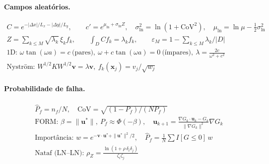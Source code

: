 \paragraph{Campos aleatórios.}
\begin{gather*}
  C = e^{-|\Delta x|/L_x - |\Delta y|/L_y}, \qquad c' = e^{\mu_{\ln} + \sigma_{\ln}Z}, \quad
  \sigma_{\ln}^2 = \ln(1 + \mathrm{CoV}^2), \quad \mu_{\ln} = \ln\mu - \tfrac12\sigma_{\ln}^2 \\
  Z = \sum_{k \leq M}\sqrt{\lambda_k}\,\xi_k f_k, \qquad \int_D C f_k = \lambda_k f_k, \qquad
  \varepsilon_M = 1 - \sum_{k \leq M}\lambda_k/|D| \\
  \text{1D: } \omega\tan(\omega a) = c \ \text{(pares)}, \ \omega + c\tan(\omega a) = 0 \ \text{(ímpares)}, \
  \lambda = \tfrac{2c}{\omega^2 + c^2} \\
  \text{Nyström: } W^{1/2}KW^{1/2}\bm v = \lambda\bm v, \ f_k(\bm x_j) = v_j/\sqrt{w_j}
\end{gather*}

\paragraph{Probabilidade de falha.}
\begin{gather*}
  \hat P_f = n_f/N, \quad \mathrm{CoV} = \sqrt{(1 - P_f)/(NP_f)} \\
  \text{FORM: } \beta = \|\bm u^*\|, \ P_f \approx \Phi(-\beta), \quad
  \bm u_{k+1} = \tfrac{\nabla G_k\cdot\bm u_k - G_k}{\|\nabla G_k\|^2}\nabla G_k \\
  \text{Importância: } w = e^{-\bm v\cdot\bm u^* + \|\bm u^*\|^2/2}, \quad \hat P_f = \tfrac1N\sum I[G \leq 0]\,w \\
  \text{Nataf (LN--LN): } \rho_Z = \tfrac{\ln(1 + \rho\,\delta_i\delta_j)}{\zeta_i\zeta_j}
\end{gather*}

